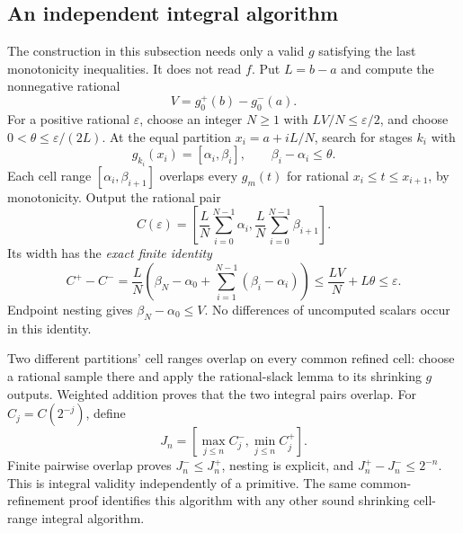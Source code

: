 \subsection{An independent integral algorithm}
The construction in this subsection needs only a valid $g$ satisfying the
last monotonicity inequalities.  It does not read $f$.
Put $L=b-a$ and compute the nonnegative rational
\[
 V=g_0^+(b)-g_0^-(a).
\]
For a positive rational $\varepsilon$, choose an integer $N\ge1$ with
$LV/N\le\varepsilon/2$, and choose $0<\theta\le\varepsilon/(2L)$.
At the equal partition $x_i=a+iL/N$, search for stages $k_i$ with
\[
 g_{k_i}(x_i)=[\alpha_i,\beta_i],\qquad \beta_i-\alpha_i\le\theta.
\]
Each cell range $[\alpha_i,\beta_{i+1}]$ overlaps every $g_m(t)$ for
rational $x_i\le t\le x_{i+1}$, by monotonicity.  Output the rational pair
\[
 C(\varepsilon)=\left[
    \frac LN\sum_{i=0}^{N-1}\alpha_i,
    \frac LN\sum_{i=0}^{N-1}\beta_{i+1}\right].
\]
Its width has the \emph{exact finite identity}
\[
 C^+-C^-=\frac LN\left(\beta_N-\alpha_0
                   +\sum_{i=1}^{N-1}(\beta_i-\alpha_i)\right)
        \le\frac{LV}{N}+L\theta\le\varepsilon.
\]
Endpoint nesting gives $\beta_N-\alpha_0\le V$.  No differences
of uncomputed scalars occur in this identity.

Two different partitions' cell ranges overlap on every common refined
cell: choose a rational sample there and apply the rational-slack lemma
to its shrinking $g$ outputs.  Weighted addition proves that the two
integral pairs overlap.  For $C_j=C(2^{-j})$, define
\[
 J_n=\left[\max_{j\le n}C_j^-,\min_{j\le n}C_j^+\right].
\]
Finite pairwise overlap proves $J_n^-\le J_n^+$, nesting is explicit,
and $J_n^+-J_n^-\le2^{-n}$.  This is integral validity independently
of a primitive.  The same common-refinement proof identifies this
algorithm with any other sound shrinking cell-range integral algorithm.

